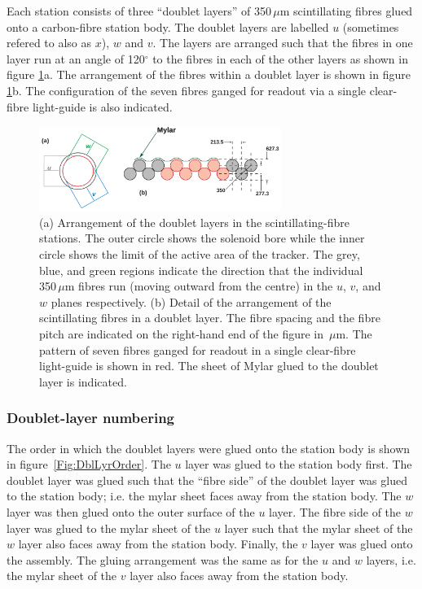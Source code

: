 Each station consists of three ``doublet layers'' of 350\,$\mu$m scintillating fibres glued onto a carbon-fibre station body. The doublet layers are labelled $u$ (sometimes refered to also as $x$), $w$ and $v$.  The layers are arranged such that the fibres in one layer run at an angle of 120$^\circ$ to the fibres in each of the other layers as shown in figure \ref{Fig:DblLyr}a.   The arrangement of the fibres within a doublet layer is shown in figure \ref{Fig:DblLyr}b.   The configuration of the seven fibres ganged for readout via a single clear-fibre light-guide is also indicated. %
\begin{figure}
  \begin{center}
    \includegraphics[width=0.7\textwidth]{detectors/tracker/02-Definitions/Figures/doublet-layer.pdf}
  \end{center}
  \caption{(a) Arrangement of the doublet layers in the scintillating-fibre  stations. The outer circle shows the solenoid bore while the inner circle shows the limit of the active area of the tracker. The grey, blue, and green regions indicate the direction that the individual 350\,$\mu$m fibres run (moving outward from the centre) in the $u$, $v$, and $w$ planes respectively. (b) Detail of the arrangement of the scintillating fibres in a doublet layer. The fibre spacing and the fibre pitch are indicated on the right-hand end of the figure in \,$\mu$m. The pattern of seven fibres ganged for readout in a single clear-fibre light-guide is shown in red. The sheet of Mylar glued to the doublet layer is indicated.}
  \label{Fig:DblLyr}
\end{figure}

\subsubsection{Doublet-layer numbering}
\label{SubSubSect:SciFiDblNmbrng}

The order in which the doublet layers were glued onto the station body is shown in figure~\ref{Fig:DblLyrOrder}. The $u$ layer was glued to the station body first. The doublet layer was glued such that the ``fibre side'' of the doublet layer was glued to the station body; i.e. the mylar sheet faces away from the station body. The $w$ layer was then glued onto the outer surface of the $u$ layer. The fibre side of the $w$ layer was glued to the mylar sheet of the $u$ layer such that the mylar sheet of the $w$ layer also faces away from the station body. Finally, the $v$ layer was glued onto the assembly. The gluing arrangement was the same as for the $u$ and $w$ layers, i.e. the mylar sheet of the $v$ layer also faces away from the station body. 


